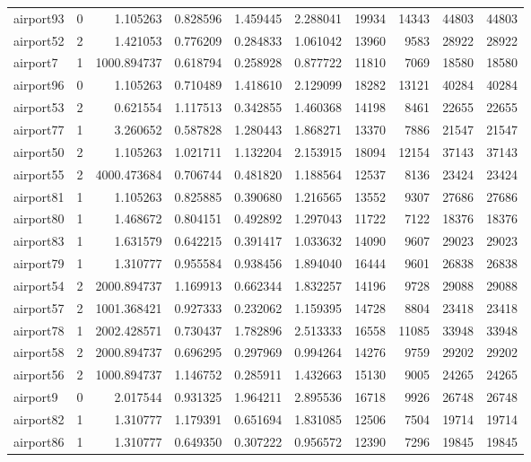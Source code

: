 \begin{longtable}{|l|r|r|r|r|r|r|r|r|r|}
airport93 & 0 & 1.105263 & 0.828596 & 1.459445 & 2.288041 & 19934 & 14343 & 44803 & 44803 \\
airport52 & 2 & 1.421053 & 0.776209 & 0.284833 & 1.061042 & 13960 & 9583 & 28922 & 28922 \\
airport7 & 1 & 1000.894737 & 0.618794 & 0.258928 & 0.877722 & 11810 & 7069 & 18580 & 18580 \\
airport96 & 0 & 1.105263 & 0.710489 & 1.418610 & 2.129099 & 18282 & 13121 & 40284 & 40284 \\
airport53 & 2 & 0.621554 & 1.117513 & 0.342855 & 1.460368 & 14198 & 8461 & 22655 & 22655 \\
airport77 & 1 & 3.260652 & 0.587828 & 1.280443 & 1.868271 & 13370 & 7886 & 21547 & 21547 \\
airport50 & 2 & 1.105263 & 1.021711 & 1.132204 & 2.153915 & 18094 & 12154 & 37143 & 37143 \\
airport55 & 2 & 4000.473684 & 0.706744 & 0.481820 & 1.188564 & 12537 & 8136 & 23424 & 23424 \\
airport81 & 1 & 1.105263 & 0.825885 & 0.390680 & 1.216565 & 13552 & 9307 & 27686 & 27686 \\
airport80 & 1 & 1.468672 & 0.804151 & 0.492892 & 1.297043 & 11722 & 7122 & 18376 & 18376 \\
airport83 & 1 & 1.631579 & 0.642215 & 0.391417 & 1.033632 & 14090 & 9607 & 29023 & 29023 \\
airport79 & 1 & 1.310777 & 0.955584 & 0.938456 & 1.894040 & 16444 & 9601 & 26838 & 26838 \\
airport54 & 2 & 2000.894737 & 1.169913 & 0.662344 & 1.832257 & 14196 & 9728 & 29088 & 29088 \\
airport57 & 2 & 1001.368421 & 0.927333 & 0.232062 & 1.159395 & 14728 & 8804 & 23418 & 23418 \\
airport78 & 1 & 2002.428571 & 0.730437 & 1.782896 & 2.513333 & 16558 & 11085 & 33948 & 33948 \\
airport58 & 2 & 2000.894737 & 0.696295 & 0.297969 & 0.994264 & 14276 & 9759 & 29202 & 29202 \\
airport56 & 2 & 1000.894737 & 1.146752 & 0.285911 & 1.432663 & 15130 & 9005 & 24265 & 24265 \\
airport9 & 0 & 2.017544 & 0.931325 & 1.964211 & 2.895536 & 16718 & 9926 & 26748 & 26748 \\
airport82 & 1 & 1.310777 & 1.179391 & 0.651694 & 1.831085 & 12506 & 7504 & 19714 & 19714 \\
airport86 & 1 & 1.310777 & 0.649350 & 0.307222 & 0.956572 & 12390 & 7296 & 19845 & 19845 \\

\end{longtable}
